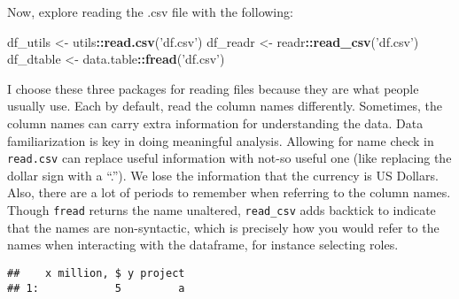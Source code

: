 \documentclass[]{book}
\newenvironment{Shaded}{\begin{snugshade}}{\end{snugshade}}
\newcommand{\DataTypeTok}[1]{\textcolor[rgb]{0.13,0.29,0.53}{#1}}
\newcommand{\DecValTok}[1]{\textcolor[rgb]{0.00,0.00,0.81}{#1}}
\newcommand{\KeywordTok}[1]{\textcolor[rgb]{0.13,0.29,0.53}{\textbf{#1}}}
\newcommand{\NormalTok}[1]{#1}
\newcommand{\OperatorTok}[1]{\textcolor[rgb]{0.81,0.36,0.00}{\textbf{#1}}}
\newcommand{\StringTok}[1]{\textcolor[rgb]{0.31,0.60,0.02}{#1}}
\begin{document}
Now, explore reading the .csv file with the following:

\begin{Shaded}
\begin{Highlighting}[]
\NormalTok{df_utils <-}\StringTok{ }\NormalTok{utils}\OperatorTok{::}\KeywordTok{read.csv}\NormalTok{(}\StringTok{'df.csv'}\NormalTok{)}
\NormalTok{df_readr <-}\StringTok{ }\NormalTok{readr}\OperatorTok{::}\KeywordTok{read_csv}\NormalTok{(}\StringTok{'df.csv'}\NormalTok{)}
\NormalTok{df_dtable <-}\StringTok{ }\NormalTok{data.table}\OperatorTok{::}\KeywordTok{fread}\NormalTok{(}\StringTok{'df.csv'}\NormalTok{)}
\end{Highlighting}
\end{Shaded}

I choose these three packages for reading files because they are what people usually use. Each by default, read the column names differently. Sometimes, the column names can carry extra information for understanding the data. Data familiarization is key in doing meaningful analysis. Allowing for name check in \texttt{read.csv} can replace useful information with not-so useful one (like replacing the dollar sign with a ``.''). We lose the information that the currency is US Dollars. Also, there are a lot of periods to remember when referring to the column names. Though \texttt{fread} returns the name unaltered, \texttt{read\_csv} adds backtick to indicate that the names are non-syntactic, which is precisely how you would refer to the names when interacting with the dataframe, for instance selecting roles.

\begin{Shaded}
\end{Shaded}

\begin{verbatim}
##    x million, $ y project
## 1:            5         a
\end{verbatim}

\begin{Shaded}
\end{Shaded}
\end{document}
